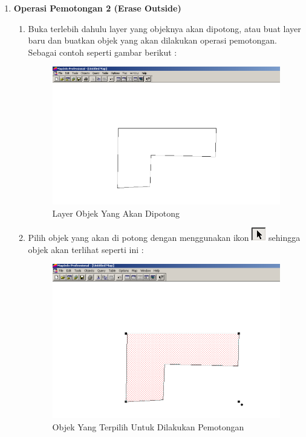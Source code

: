 \begin{enumerate}[\bfseries A.]
  \item \textbf{Operasi Pemotongan 2 (Erase Outside)}
  
  \begin{enumerate}[1.]
    \item Buka terlebih dahulu layer yang objeknya akan dipotong, atau buat layer baru dan buatkan objek yang akan dilakukan operasi pemotongan. Sebagai contoh seperti gambar berikut :
    
    \begin{figure}[H]
      \centering
      \includegraphics[width=1\textwidth]{./resources/032-layer-untuk-erase-2}
      \caption{Layer Objek Yang Akan Dipotong}
    \end{figure}
  
    \item Pilih objek yang akan di potong dengan menggunakan ikon \includegraphics{./resources/008-ikon-select} sehingga objek akan terlihat seperti ini :
    
    \begin{figure}[H]
      \centering
      \includegraphics[width=1\textwidth]{./resources/033-objek-terpilih-untuk-erase-2}
      \caption{Objek Yang Terpilih Untuk Dilakukan Pemotongan}
    \end{figure}
    

\end{enumerate}
\end{enumerate}
